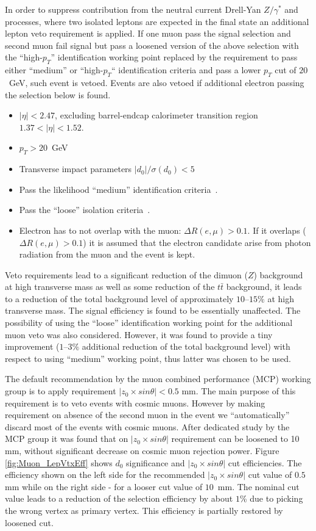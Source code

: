 In order to suppress contribution from the neutral current Drell-Yan $Z/\gamma^*$ and \ttbar  processes,
where two isolated leptons are expected in the final state an additional lepton veto requirement
is applied. If one muon pass the signal selection and second muon fail signal but pass a loosened version of the above selection with the ``high-$p_T$'' identification working point replaced by the requirement to pass either ``medium'' or
``high-$p_T$`` identification criteria and pass a lower $p_T$ cut of $20$~GeV, such event is vetoed.
Events are also vetoed if additional electron passing the selection below is found.
\begin{itemize}
\item $|\eta| < 2.47$, excluding barrel-endcap calorimeter transition region $1.37 < |\eta| < 1.52$.
\item $p_T > 20$~GeV
\item Transverse impact parameters $|d_0|/\sigma(d_0) < 5$
\item Pass the likelihood ``medium'' identification criteria~\cite{ATL-PHYS-PUB-2015-041}.
\item Pass the ``loose'' isolation criteria~\cite{ATLAS-CONF-2016-024}.
\item Electron has to not overlap with the muon: $\Delta R(e,\mu)>0.1$. If it overlaps ($\Delta R(e,\mu)>0.1$)
it is assumed that the electron candidate arise from photon radiation from the muon and the event is kept.
\end{itemize}
Veto requirements lead to a significant reduction of the dimuon ($Z$) background
at high transverse mass as well as some reduction of the $t\bar{t}$ background, it leads to a reduction of the total background level of approximately $10$--$15\%$ at high transverse mass. 
The signal efficiency is found to be essentially unaffected.
The possibility of using the ``loose'' identification working point for the additional muon veto was also considered. However, it was found to provide a tiny improvement ($1$--$3\%$ additional reduction of the total background level) with respect to using ``medium'' working point, thus latter was chosen to be used.

The default recommendation by the muon combined performance (MCP) working group is to apply requirement $|z_0 \times sin \theta| < 0.5$ mm. The main purpose of this requirement is to veto events with cosmic muons.
However by making requirement on absence of the second muon in the event we ``automatically'' discard most of the events with cosmic muons. After dedicated study by the MCP group it was found that on 
$|z_0 \times sin \theta|$ requirement can be loosened to 10 mm, without significant decrease on cosmic muon rejection power.
Figure \ref{fig:Muon_LepVtxEff} shows $d_0$ significance and $|z_0 \times sin \theta|$ cut efficiencies. The efficiency shown on the left side for the recommended $|z_0 \times sin \theta|$ cut value of $0.5$ mm while on the right side - for a looser
cut value of $10$~mm. The nominal cut value leads to a reduction of the selection efficiency by about $1$\% due to picking the wrong vertex as primary vertex. This efficiency
is partially restored by loosened cut.

